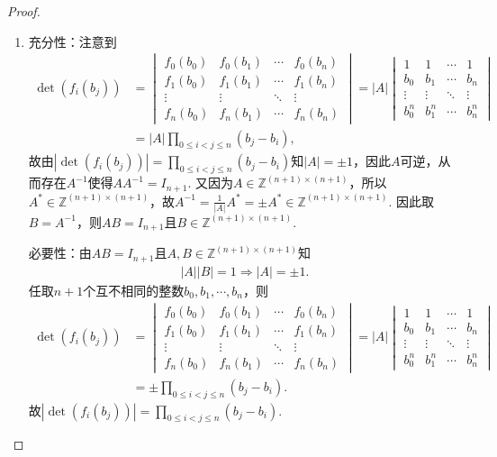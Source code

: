 \documentclass[../../main.tex]{subfiles}%
\begin{document}
\begin{proof}
\begin{enumerate}[(1)]
\item {\heiti 充分性：}注意到
\begin{align*}
\det(f_i(b_j))&=\begin{vmatrix}
f_0(b_0)&f_0(b_1)&\cdots&f_0(b_n)\\
f_1(b_0)&f_1(b_1)&\cdots&f_1(b_n)\\
\vdots&\vdots&\ddots&\vdots\\
f_n(b_0)&f_n(b_1)&\cdots&f_n(b_n)
\end{vmatrix}=|A|\begin{vmatrix}
1&1&\cdots&1\\
b_0&b_1&\cdots&b_n\\
\vdots&\vdots&\ddots&\vdots\\
b_0^n&b_1^n&\cdots&b_n^n
\end{vmatrix}\\
&=|A|\prod_{0\leqslant i<j\leqslant n}(b_j-b_i),
\end{align*}
故由$|\det(f_i(b_j))|=\prod_{0\leqslant i<j\leqslant n}(b_j-b_i)$知$|A|=\pm 1$，因此$A$可逆，从而存在$A^{-1}$使得$AA^{-1}=I_{n+1}$. 又因为$A\in \mathbb{Z}^{(n+1)\times(n+1)}$，所以$A^*\in \mathbb{Z}^{(n+1)\times(n+1)}$，故$A^{-1}=\frac{1}{|A|}A^*=\pm A^*\in \mathbb{Z}^{(n+1)\times(n+1)}$. 因此取$B=A^{-1}$，则$AB=I_{n+1}$且$B\in \mathbb{Z}^{(n+1)\times(n+1)}$.

{\heiti 必要性：}由$AB=I_{n+1}$且$A,B\in \mathbb{Z}^{(n+1)\times(n+1)}$知
\begin{align*}
|A||B|=1\Longrightarrow |A|=\pm 1.
\end{align*}
任取$n+1$个互不相同的整数$b_0,b_1,\cdots,b_n$，则
\begin{align*}
\det(f_i(b_j))&=\begin{vmatrix}
f_0(b_0)&f_0(b_1)&\cdots&f_0(b_n)\\
f_1(b_0)&f_1(b_1)&\cdots&f_1(b_n)\\
\vdots&\vdots&\ddots&\vdots\\
f_n(b_0)&f_n(b_1)&\cdots&f_n(b_n)
\end{vmatrix}=|A|\begin{vmatrix}
1&1&\cdots&1\\
b_0&b_1&\cdots&b_n\\
\vdots&\vdots&\ddots&\vdots\\
b_0^n&b_1^n&\cdots&b_n^n
\end{vmatrix}\\
&=\pm \prod_{0\leqslant i<j\leqslant n}(b_j-b_i).
\end{align*}
故$|\det(f_i(b_j))|=\prod_{0\leqslant i<j\leqslant n}(b_j-b_i)$.
\end{enumerate}

\end{proof}
\end{document}
